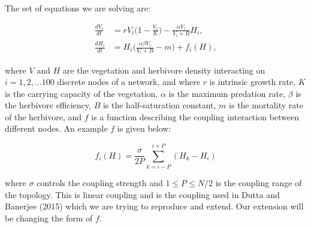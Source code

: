 \documentclass[11pt]{amsart}
\title{}
\author{}
\begin{document}
\maketitle

The set of equations we are solving are:

\begin{align}
\frac{dV_i}{dt} &= rV_i\Big(1 - \frac{V_i}{K}\Big) - \frac{\alpha V_i}{V_i + B}H_i, \\
\frac{dH_i}{dt} &= H_i\Big(\frac{\alpha \beta V_i}{V_i + B} - m\Big) + f_i(H),
\end{align}

\noindent where $V$ and $H$ are the vegetation and herbivore density interacting on $i = 1, 2, ... 100$ discrete nodes of a network, and where $r$ is intrinsic growth rate, $K$ is the carrying capacity of the vegetation, $\alpha$ is the maximum predation rate, $\beta$ is the herbivore efficiency, $B$ is the half-saturation constant, $m$ is the mortality rate of the herbivore, and $f$ is a function describing the coupling interaction between different nodes. An example $f$ is given below:

\begin{equation}
f_i(H) = \frac{\sigma}{2P} \sum_{k = i - P}^{i + P} (H_k - H_i)
\end{equation}

\noindent where $\sigma$ controls the coupling strength and $1 \leq P \leq N/2$ is the coupling range of the topology. This is linear coupling and is the coupling used in Dutta and Banerjee (2015) which we are trying to reproduce and extend. Our extension will be changing the form of $f$.
\end{document}
